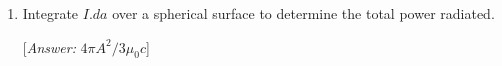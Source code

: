 \documentclass[fleqn]{article}
\begin{document}
\begin{enumerate}
\begin{enumerate}

      \item Integrate $I.da$ over a spherical surface to determine the total power radiated.
      
      [\emph{Answer:} $4 \pi A^2/3 \mu_0 c$]


    \end{enumerate}

  \end{enumerate}
\end{document}
